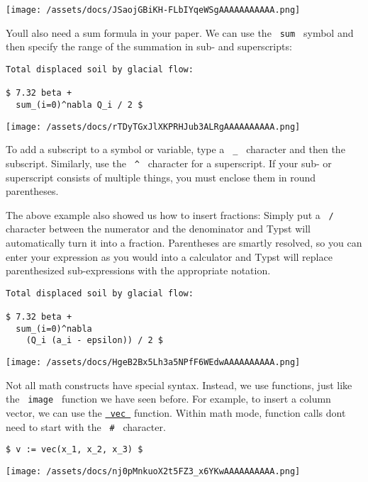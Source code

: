 \texttt{[image: /assets/docs/JSaojGBiKH-FLbIYqeWSgAAAAAAAAAAA.png]}

You\textquotesingle ll also need a sum formula in your paper. We can use
the \texttt{\ sum\ } symbol and then specify the range of the summation
in sub- and superscripts:

\begin{verbatim}
Total displaced soil by glacial flow:

$ 7.32 beta +
  sum_(i=0)^nabla Q_i / 2 $
\end{verbatim}

\texttt{[image: /assets/docs/rTDyTGxJlXKPRHJub3ALRgAAAAAAAAAA.png]}

To add a subscript to a symbol or variable, type a \texttt{\ \_\ }
character and then the subscript. Similarly, use the \texttt{\ \^{}\ }
character for a superscript. If your sub- or superscript consists of
multiple things, you must enclose them in round parentheses.

The above example also showed us how to insert fractions: Simply put a
\texttt{\ /\ } character between the numerator and the denominator and
Typst will automatically turn it into a fraction. Parentheses are
smartly resolved, so you can enter your expression as you would into a
calculator and Typst will replace parenthesized sub-expressions with the
appropriate notation.

\begin{verbatim}
Total displaced soil by glacial flow:

$ 7.32 beta +
  sum_(i=0)^nabla
    (Q_i (a_i - epsilon)) / 2 $
\end{verbatim}

\texttt{[image: /assets/docs/HgeB2Bx5Lh3a5NPfF6WEdwAAAAAAAAAA.png]}

Not all math constructs have special syntax. Instead, we use functions,
just like the \texttt{\ image\ } function we have seen before. For
example, to insert a column vector, we can use the
\href{/docs/reference/math/vec/}{\texttt{\ vec\ }} function. Within math
mode, function calls don\textquotesingle t need to start with the
\texttt{\ \#\ } character.

\begin{verbatim}
$ v := vec(x_1, x_2, x_3) $
\end{verbatim}

\texttt{[image: /assets/docs/nj0pMnkuoX2t5FZ3\_x6YKwAAAAAAAAAA.png]}


